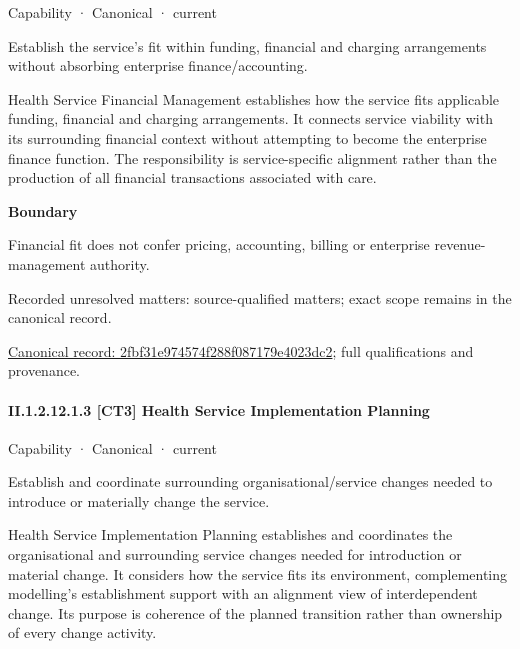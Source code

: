\label{element:2fbf31e974574f288f087179e4023dc2}
{\small Capability · Canonical · current}\par

Establish the service’s fit within funding, financial and charging arrangements without absorbing enterprise finance/accounting.



Health Service Financial Management establishes how the service fits applicable funding, financial and charging arrangements. It connects service viability with its surrounding financial context without attempting to become the enterprise finance function. The responsibility is service-specific alignment rather than the production of all financial transactions associated with care.



\textbf{Boundary}



Financial fit does not confer pricing, accounting, billing or enterprise revenue-management authority.


{\small Recorded unresolved matters: source-qualified matters; exact scope remains in the canonical record.}\par
{\footnotesize \href{../../../../../../../continuum/strategy/capability/2fbf31e974574f288f087179e4023dc2.md}{Canonical record: 2fbf31e974574f288f087179e4023dc2}; full qualifications and provenance.}\par
\paragraph*{II.1.2.12.1.3 [CT3] Health Service Implementation Planning}
\label{navigation:II.1.2.12.1.3}

\label{element:67bd795d91ce4dd49fdd481a3c451366}
{\small Capability · Canonical · current}\par

Establish and coordinate surrounding organisational/service changes needed to introduce or materially change the service.



Health Service Implementation Planning establishes and coordinates the organisational and surrounding service changes needed for introduction or material change. It considers how the service fits its environment, complementing modelling's establishment support with an alignment view of interdependent change. Its purpose is coherence of the planned transition rather than ownership of every change activity.



